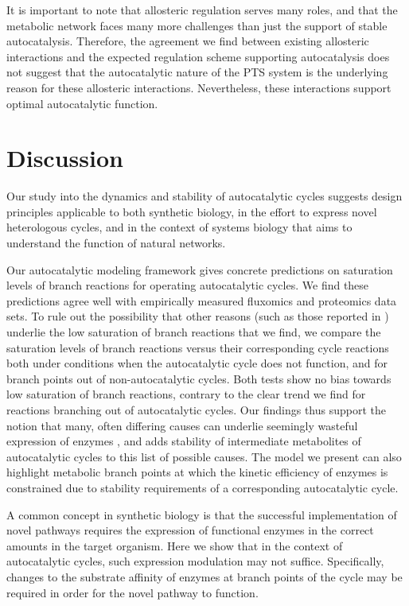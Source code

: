     It is important to note that allosteric regulation serves many roles, and that the metabolic network faces many more challenges than just the support of stable autocatalysis.
    Therefore, the agreement we find between existing allosteric interactions and the expected regulation scheme supporting autocatalysis does not suggest that the autocatalytic nature of the PTS system is the underlying reason for these allosteric interactions.
    Nevertheless, these interactions support optimal autocatalytic function.
\section{Discussion}
Our study into the dynamics and stability of autocatalytic cycles suggests design principles applicable to both synthetic biology, in the effort to express novel heterologous cycles, and in the context of systems biology that aims to understand the function of natural networks.

Our autocatalytic modeling framework gives concrete predictions on saturation levels of branch reactions for operating autocatalytic cycles.
We find these predictions agree well with empirically measured fluxomics and proteomics data sets.
To rule out the possibility that other reasons (such as those reported in \cite{Staples1997-fq,Weiss1998-gp,Suarez1997-jo}) underlie the low saturation of branch reactions that we find, we compare the saturation levels of branch reactions versus their corresponding cycle reactions both under conditions when the autocatalytic cycle does not function, and for branch points out of non-autocatalytic cycles.
Both tests show no bias towards low saturation of branch reactions, contrary to the clear trend we find for reactions branching out of autocatalytic cycles.
Our findings thus support the notion that many, often differing causes can underlie seemingly wasteful expression of enzymes \cite{Salvador2003-fc, Salvador2006-yx}, and adds stability of intermediate metabolites of autocatalytic cycles to this list of possible causes.
The model we present can also highlight metabolic branch points at which the kinetic efficiency of enzymes is constrained due to stability requirements of a corresponding autocatalytic cycle.

A common concept in synthetic biology is that the successful implementation of novel pathways requires the expression of functional enzymes in the correct amounts in the target organism.
Here we show that in the context of autocatalytic cycles, such expression modulation may not suffice.
Specifically, changes to the substrate affinity of enzymes at branch points of the cycle may be required in order for the novel pathway to function.

